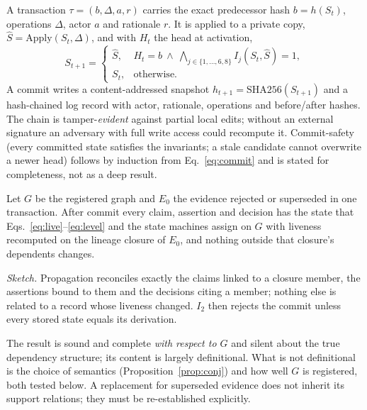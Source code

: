 \documentclass[cmc,article,submit,moreauthors,pdftex]{Definitions/tsp}
\begin{document}
A transaction $\tau=(b,\Delta,a,r)$ carries the exact predecessor hash $b=h(S_t)$, operations $\Delta$, actor $a$ and rationale $r$. It is applied to a private copy, $\widehat S=\mathrm{Apply}(S_t,\Delta)$, and with $H_t$ the head at activation,
\begin{equation}
S_{t+1}=\begin{cases}\widehat S, & H_t=b\ \land\ \bigwedge_{j\in\{1,\dots,6,8\}} I_j(S_t,\widehat S)=1,\\ S_t, & \text{otherwise.}\end{cases}
\label{eq:commit}
\end{equation}
A commit writes a content-addressed snapshot $h_{t+1}=\mathrm{SHA256}(S_{t+1})$ and a hash-chained log record with actor, rationale, operations and before/after hashes. The chain is tamper-\emph{evident} against partial local edits; without an external signature an adversary with full write access could recompute it. Commit-safety (every committed state satisfies the invariants; a stale candidate cannot overwrite a newer head) follows by induction from Eq.~\eqref{eq:commit} and is stated for completeness, not as a deep result.

\begin{Proposition}\label{prop:prop}
Let $G$ be the registered graph and $E_0$ the evidence rejected or superseded in one transaction. After commit every claim, assertion and decision has the state that Eqs.~\eqref{eq:live}--\eqref{eq:level} and the state machines assign on $G$ with liveness recomputed on the lineage closure of $E_0$, and nothing outside that closure's dependents changes.
\end{Proposition}
\emph{Sketch.} Propagation reconciles exactly the claims linked to a closure member, the assertions bound to them and the decisions citing a member; nothing else is related to a record whose liveness changed. $I_2$ then rejects the commit unless every stored state equals its derivation. \qedhere

The result is sound and complete \emph{with respect to $G$} and silent about the true dependency structure; its content is largely definitional. What is not definitional is the choice of semantics (Proposition~\ref{prop:conj}) and how well $G$ is registered, both tested below. A replacement for superseded evidence does not inherit its support relations; they must be re-established explicitly.
\end{document}
